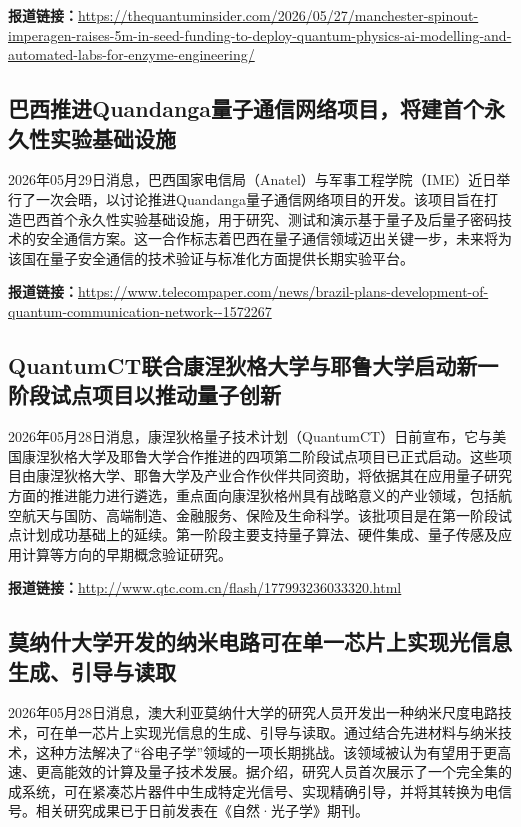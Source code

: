 \documentclass[12pt,a4paper]{ctexart}
\begin{document}
\noindent\textbf{报道链接：}\url{https://thequantuminsider.com/2026/05/27/manchester-spinout-imperagen-raises-5m-in-seed-funding-to-deploy-quantum-physics-ai-modelling-and-automated-labs-for-enzyme-engineering/}

\subsection{ 巴西推进Quandanga量子通信网络项目，将建首个永久性实验基础设施 }

2026年05月29日消息，巴西国家电信局（Anatel）与军事工程学院（IME）近日举行了一次会晤，以讨论推进Quandanga量子通信网络项目的开发。该项目旨在打造巴西首个永久性实验基础设施，用于研究、测试和演示基于量子及后量子密码技术的安全通信方案。这一合作标志着巴西在量子通信领域迈出关键一步，未来将为该国在量子安全通信的技术验证与标准化方面提供长期实验平台。

\noindent\textbf{报道链接：}\url{https://www.telecompaper.com/news/brazil-plans-development-of-quantum-communication-network--1572267}

\subsection{ QuantumCT联合康涅狄格大学与耶鲁大学启动新一阶段试点项目以推动量子创新 }

2026年05月28日消息，康涅狄格量子技术计划（QuantumCT）日前宣布，它与美国康涅狄格大学及耶鲁大学合作推进的四项第二阶段试点项目已正式启动。这些项目由康涅狄格大学、耶鲁大学及产业合作伙伴共同资助，将依据其在应用量子研究方面的推进能力进行遴选，重点面向康涅狄格州具有战略意义的产业领域，包括航空航天与国防、高端制造、金融服务、保险及生命科学。该批项目是在第一阶段试点计划成功基础上的延续。第一阶段主要支持量子算法、硬件集成、量子传感及应用计算等方向的早期概念验证研究。

\noindent\textbf{报道链接：}\url{http://www.qtc.com.cn/flash/177993236033320.html}

\subsection{ 莫纳什大学开发的纳米电路可在单一芯片上实现光信息生成、引导与读取 }

2026年05月28日消息，澳大利亚莫纳什大学的研究人员开发出一种纳米尺度电路技术，可在单一芯片上实现光信息的生成、引导与读取。通过结合先进材料与纳米技术，这种方法解决了“谷电子学”领域的一项长期挑战。该领域被认为有望用于更高速、更高能效的计算及量子技术发展。据介绍，研究人员首次展示了一个完全集的成系统，可在紧凑芯片器件中生成特定光信号、实现精确引导，并将其转换为电信号。相关研究成果已于日前发表在《自然·光子学》期刊。
\end{document}
